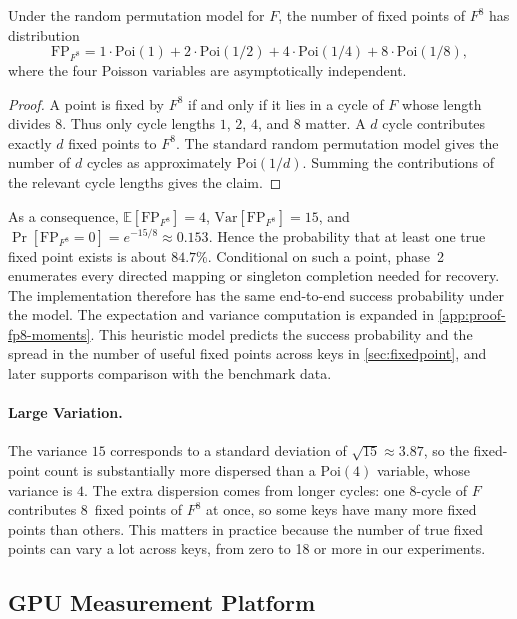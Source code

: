 \documentclass[version=preprint]{iacrcc}
\begin{document}
\begin{lemma}\label{lem:fp8-distribution}
Under the random permutation model for $F$, the number of fixed points of $F^8$ has distribution
\[
\mathrm{FP}_{F^8} = 1\cdot \mathrm{Poi}(1)
+ 2\cdot \mathrm{Poi}(1/2)
+ 4\cdot \mathrm{Poi}(1/4)
+ 8\cdot \mathrm{Poi}(1/8),
\]
where the four Poisson variables are asymptotically independent.
\end{lemma}

\begin{proof}
A point is fixed by $F^8$ if and only if it lies in a cycle of $F$ whose length divides $8$.
Thus only cycle lengths $1$, $2$, $4$, and $8$ matter.
A $d$ cycle contributes exactly $d$ fixed points to $F^8$.
The standard random permutation model gives the number of $d$ cycles as approximately $\mathrm{Poi}(1/d)$.
Summing the contributions of the relevant cycle lengths gives the claim.
\end{proof}

As a consequence, $\mathbb{E}[\mathrm{FP}_{F^8}] = 4$, $\mathrm{Var}[\mathrm{FP}_{F^8}] = 15$, and $\Pr[\mathrm{FP}_{F^8} = 0] = e^{-15/8} \approx 0.153$.
Hence the probability that at least one true fixed point exists is about $84.7\%$.
Conditional on such a point, phase~2 enumerates every directed mapping or singleton completion needed for recovery.
The implementation therefore has the same end-to-end success probability under the model.
The expectation and variance computation is expanded in \autoref{app:proof-fp8-moments}.
This heuristic model predicts the success probability and the spread in the number of useful fixed points across keys in \autoref{sec:fixedpoint}, and later supports comparison with the benchmark data.

\paragraph{Large Variation.}
The variance $15$ corresponds to a standard deviation of $\sqrt{15}\approx3.87$, so the fixed-point count is substantially more dispersed than a $\mathrm{Poi}(4)$ variable, whose variance is $4$.
The extra dispersion comes from longer cycles: one 8-cycle of $F$ contributes 8~fixed points of $F^8$ at once, so some keys have many more fixed points than others.
This matters in practice because the number of true fixed points can vary a lot across keys, from zero to 18 or more in our experiments.

\subsection{GPU Measurement Platform}\label{subsec:gpu-platform}
\end{document}
